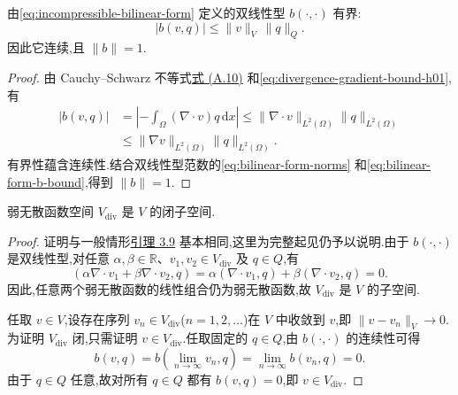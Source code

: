 \begin{lemma}\label{lem:bounded-bilinear-form-b}
由\cref{eq:incompressible-bilinear-form} 定义的双线性型 $b(\cdot,\cdot)$ 有界:
\[
  |b(v,q)|\le\|v\|_V\,\|q\|_Q.
\]
因此它连续,且 $\|b\|=1$.
\end{lemma}
\begin{proof}
由 Cauchy--Schwarz 不等式\hyperref[eq:appendix-a-10]{式 (A.10)} 和\cref{eq:divergence-gradient-bound-h01},有
\begin{equation}\label{eq:bilinear-form-b-bound}
\begin{aligned}
  |b(v,q)|
   &=\left|-\int_\Omega(\nabla\cdot v)q\,\mathrm{d}x\right|
    \le\|\nabla\cdot v\|_{L^2(\Omega)}\|q\|_{L^2(\Omega)}\\
   &\le\|\nabla v\|_{L^2(\Omega)}\|q\|_{L^2(\Omega)}.
\end{aligned}
\end{equation}
有界性蕴含连续性.结合双线性型范数的\cref{eq:bilinear-form-norms} 和\cref{eq:bilinear-form-b-bound},得到 $\|b\|=1$.
\end{proof}

\begin{lemma}\label{lem:vdiv-closed}
弱无散函数空间 $V_{\mathrm{div}}$ 是 $V$ 的闭子空间.
\end{lemma}
\begin{proof}
证明与一般情形\hyperref[lem:closed-kernel-subspaces]{引理 3.9} 基本相同,这里为完整起见仍予以说明.由于 $b(\cdot,\cdot)$ 是双线性型,对任意 $\alpha,\beta\in\mathbb{R}$、$v_1,v_2\in V_{\mathrm{div}}$ 及 $q\in Q$,有
\[
  (\alpha\nabla\cdot v_1+\beta\nabla\cdot v_2,q)
    =\alpha(\nabla\cdot v_1,q)+\beta(\nabla\cdot v_2,q)=0.
\]
因此,任意两个弱无散函数的线性组合仍为弱无散函数,故 $V_{\mathrm{div}}$ 是 $V$ 的子空间.

任取 $v\in V$,设存在序列 $v_n\in V_{\mathrm{div}}$($n=1,2,\ldots$)在 $V$ 中收敛到 $v$,即 $\|v-v_n\|_V\to0$.为证明 $V_{\mathrm{div}}$ 闭,只需证明 $v\in V_{\mathrm{div}}$.任取固定的 $q\in Q$,由 $b(\cdot,\cdot)$ 的连续性可得
\[
  b(v,q)=b\!\left(\lim_{n\to\infty}v_n,q\right)
    =\lim_{n\to\infty}b(v_n,q)=0.
\]
由于 $q\in Q$ 任意,故对所有 $q\in Q$ 都有 $b(v,q)=0$,即 $v\in V_{\mathrm{div}}$.
\end{proof}

